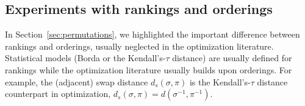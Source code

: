 \documentclass[sigconf,dvipsnames]{acmart}
\newcommand{\supplement}{\href{http://doi.org/10.5281/zenodo.4500974}{doi:~10.5281/zenodo.4500974}}
\newcommand{\ken}{Kendall's-$\tau$\xspace}
\begin{document}

\newcommand{\CEGOorig}{CEGO$_\textsc{ori}$\xspace}
\newcommand{\CEGOinv}{CEGO$_\textsc{inv}$\xspace}

\subsection{Experiments with rankings and orderings}\label{sec:exper_ro}


In Section~\ref{sec:permutations}, we highlighted the important difference between rankings and orderings, usually neglected in the optimization literature. Statistical models (Borda or the \ken distance) are usually defined for rankings while the optimization literature usually builds upon orderings. For example, the (adjacent) swap distance $d_s(\sigma,\pi)$ is the \ken distance counterpart in optimization, $d_s(\sigma,\pi) = d(\sigma^{-1}, \pi^{-1})$. %
\end{document}
